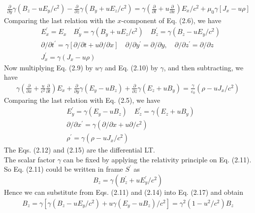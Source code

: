 \begin{align*}
\frac{\partial}{\partial y} \gamma\left(B_{z}-u E_{y} / c^{2}\right)- \frac{\partial}{\partial z} \gamma\left(B_{y}+u E_{z} / c^{2}\right)
=\gamma\left(\frac{\partial}{\partial t}+u \frac{\partial}{\partial x}\right) E_{x} / c^{2}+\mu_{0} \gamma\left[J_{x}-u \rho\right]
\end{align*}
Comparing the last relation with the $x$-component of Eq. (2.6), we have
\begin{align}
&E_{x}^{\prime}=E_{x} \quad B_{y}^{\prime}=\gamma\left(B_{y}+u E_{z} / c^{2}\right) \quad B_{z}^{\prime}=\gamma\left(B_{z}-u E_{y} / c^{2}\right)\\
&\partial / \partial t^{\prime}=\gamma[\partial / \partial t+u \partial / \partial x] \quad \partial / \partial y^{\prime}=\partial / \partial y, \quad \partial / \partial z^{\prime}=\partial / \partial z\\
&J_{x}^{\prime}=\gamma\left(J_{x}-u \rho\right)
\end{align}
Now multiplying Eq. (2.9) by $u \gamma$ and Eq. (2.10) by $\gamma$, and then subtracting, we have
\begin{align*}
\gamma\left(\frac{\partial}{\partial x}+\frac{u}{c^{2}} \frac{\partial}{\partial t}\right) E_{x}+\frac{\partial}{\partial y} \gamma\left(E_{y}-u B_{z}\right)+\frac{\partial}{\partial z}  \gamma\left(E_{z}+u B_{y}\right) 
=\frac{\gamma}{\varepsilon_{0}}\left(\rho-u J_{x} / c^{2}\right)
\end{align*}
 Comparing the last relation with Eq. (2.5), we have 
 \begin{align}
 &E_{y}^{\prime}=\gamma\left(E_{y}-u B_{z}\right) \quad  E_{z}^{\prime}=\gamma\left(E_{z}+u B_{y}\right)\\
 &\partial / \partial x^{\prime}=\gamma\left(\partial / \partial x+u \partial / c^{2}\right)\\
 &\rho^{\prime}=\gamma\left(\rho-u J_{x} / c^{2}\right)
 \end{align}
The Eqs. (2.12) and (2.15) are the differential LT.\\
 The scalar factor $\gamma$ can be fixed by applying the relativity principle on Eq. (2.11). So Eq. (2.11) could be written in frame $S^{\prime}$ as
\begin{equation}
B_{z}=\gamma\left(B_{z}^{\prime}+u E_{y}^{\prime} / c^{2}\right)
\end{equation}
Hence we can substitute from Eqs. (2.11) and (2.14) into Eq. (2.17) and obtain
\begin{align*}
B_{z}=\gamma\left[\gamma\left(B_{z}-u E_{y} / c^{2}\right)+u \gamma\left(E_{y}-u B_{z}\right) / c^{2}\right]=\gamma^{2}\left(1-u^{2} / c^{2}\right) B_{z}
\end{align*}
